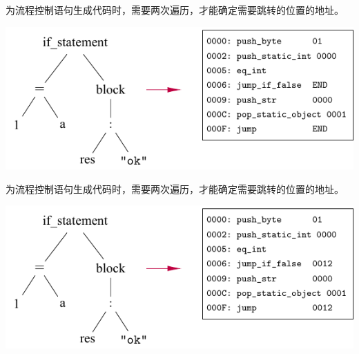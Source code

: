\documentclass[dvipsnames, svgnames, x11names]{beamer}
\begin{document}
\begin{frame}
    为流程控制语句生成代码时，需要两次遍历，才能确定需要跳转的位置的地址。

    \vspace{\baselineskip}
    \includegraphics{../figure/generator1(1).pdf}
\end{frame}

\begin{frame}
    为流程控制语句生成代码时，需要两次遍历，才能确定需要跳转的位置的地址。

    \vspace{\baselineskip}
    \includegraphics{../figure/generator1.pdf}
\end{frame}
\end{document}
